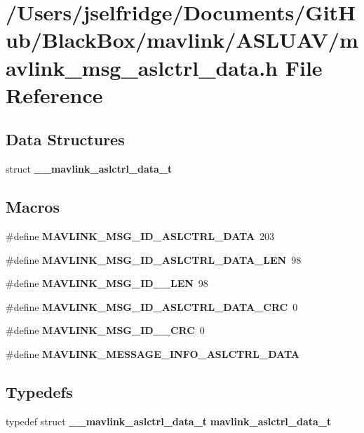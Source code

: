 \section{/\+Users/jselfridge/\+Documents/\+Git\+Hub/\+Black\+Box/mavlink/\+A\+S\+L\+U\+A\+V/mavlink\+\_\+msg\+\_\+aslctrl\+\_\+data.h File Reference}
\label{mavlink__msg__aslctrl__data_8h}
\subsection*{Data Structures}
\begin{DoxyCompactItemize}
\item 
struct \textbf{ \+\_\+\+\_\+mavlink\+\_\+aslctrl\+\_\+data\+\_\+t}
\end{DoxyCompactItemize}
\subsection*{Macros}
\begin{DoxyCompactItemize}
\item 
\#define \textbf{ M\+A\+V\+L\+I\+N\+K\+\_\+\+M\+S\+G\+\_\+\+I\+D\+\_\+\+A\+S\+L\+C\+T\+R\+L\+\_\+\+D\+A\+TA}~203
\item 
\#define \textbf{ M\+A\+V\+L\+I\+N\+K\+\_\+\+M\+S\+G\+\_\+\+I\+D\+\_\+\+A\+S\+L\+C\+T\+R\+L\+\_\+\+D\+A\+T\+A\+\_\+\+L\+EN}~98
\item 
\#define \textbf{ M\+A\+V\+L\+I\+N\+K\+\_\+\+M\+S\+G\+\_\+\+I\+D\+\_\+\_\+\+L\+EN}~98
\item 
\#define \textbf{ M\+A\+V\+L\+I\+N\+K\+\_\+\+M\+S\+G\+\_\+\+I\+D\+\_\+\+A\+S\+L\+C\+T\+R\+L\+\_\+\+D\+A\+T\+A\+\_\+\+C\+RC}~0
\item 
\#define \textbf{ M\+A\+V\+L\+I\+N\+K\+\_\+\+M\+S\+G\+\_\+\+I\+D\+\_\+\_\+\+C\+RC}~0
\item 
\#define \textbf{ M\+A\+V\+L\+I\+N\+K\+\_\+\+M\+E\+S\+S\+A\+G\+E\+\_\+\+I\+N\+F\+O\+\_\+\+A\+S\+L\+C\+T\+R\+L\+\_\+\+D\+A\+TA}
\end{DoxyCompactItemize}
\subsection*{Typedefs}
\begin{DoxyCompactItemize}
\item 
typedef struct \textbf{ \+\_\+\+\_\+mavlink\+\_\+aslctrl\+\_\+data\+\_\+t} \textbf{ mavlink\+\_\+aslctrl\+\_\+data\+\_\+t}
\end{DoxyCompactItemize}



